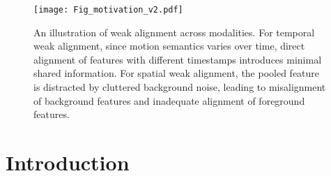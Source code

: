 \documentclass[sigconf,screen]{acmart}
\begin{document}



\maketitle


\begin{figure}[t]
\begin{center}
\texttt{[image: Fig\_motivation\_v2.pdf]}
\end{center}
   \caption{An illustration of weak alignment across modalities. For temporal weak alignment, since motion semantics varies over time, direct alignment of features with different timestamps introduces minimal shared information. For spatial weak alignment, the pooled feature is distracted by cluttered background noise, leading to misalignment of background features and inadequate alignment of foreground features.}
\label{Motivation}
\end{figure}


\section{Introduction}
\label{section:sec1}
\end{document}
